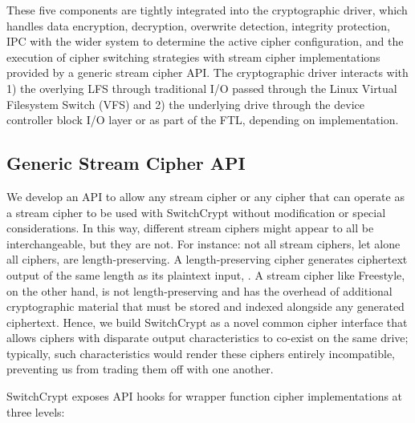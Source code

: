 These five components are tightly integrated into the cryptographic driver,
which handles data encryption, decryption, overwrite detection, integrity
protection, IPC with the wider system to determine the active cipher
configuration, and the execution of cipher switching strategies with stream
cipher implementations provided by a generic stream cipher API. The
cryptographic driver interacts with 1) the overlying LFS through traditional I/O
passed through the Linux Virtual Filesystem Switch (VFS) and 2) the underlying
drive through the device controller block I/O layer or as part of the FTL,
depending on implementation.

\subsection{Generic Stream Cipher API}

We develop an API to allow any stream cipher or any cipher that can operate as a
stream cipher to be used with SwitchCrypt without modification or special
considerations. In this way, different stream ciphers might appear to all be
interchangeable, but they are not. For instance: not all stream ciphers, let
alone all ciphers, are length-preserving. A length-preserving cipher generates
ciphertext output of the same length as its plaintext input, . A
stream cipher like Freestyle, on the other hand, is not length-preserving and has the
overhead of additional cryptographic material that must be stored and indexed
alongside any generated ciphertext. Hence, we build SwitchCrypt as a novel common
cipher interface that allows ciphers with disparate output
characteristics to co-exist on the same drive; typically, such characteristics
would render these ciphers entirely incompatible, preventing us from trading
them off with one another.

SwitchCrypt exposes API hooks for wrapper function cipher implementations at three
levels:

